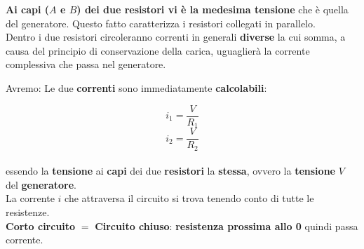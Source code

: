 \documentclass{article}
\begin{document}

\textbf{Ai capi ($A$ e $B$) dei due resistori vi è la medesima tensione} che è quella del generatore. Questo fatto caratterizza i resistori collegati in parallelo.\\
Dentro i due resistori circoleranno correnti in generali \textbf{diverse} la cui somma, a causa del principio di conservazione della carica, uguaglierà la corrente complessiva che passa nel generatore.

Avremo: 
Le due \textbf{correnti} sono immediatamente \textbf{calcolabili}:

\begin{equation}
  i_1=\frac{V}{R_1}
\end{equation}
\begin{equation}
  i_2=\frac{V}{R_2}
\end{equation}\\
essendo la \textbf{tensione} ai \textbf{capi} dei due \textbf{resistori} la \textbf{stessa}, ovvero la \textbf{tensione} $V$ del \textbf{generatore}.\\
La corrente $i$ che attraversa il circuito si trova tenendo conto di tutte le resistenze. \\
\textbf{Corto circuito} $=$ \textbf{Circuito chiuso}: \textbf{resistenza prossima allo 0} quindi passa corrente.\\




\end{document}
